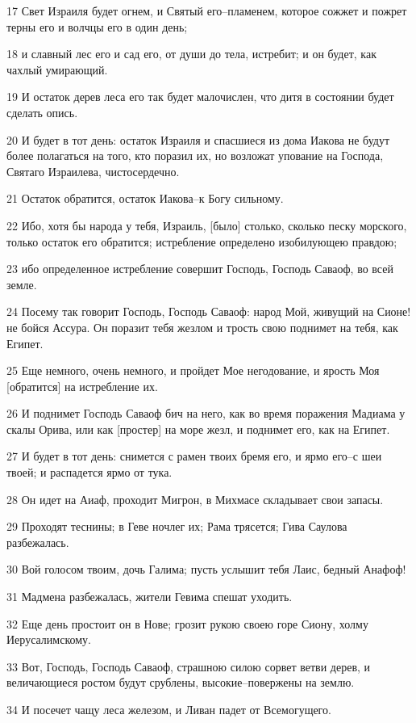 \par 17 Свет Израиля будет огнем, и Святый его--пламенем, которое сожжет и пожрет терны его и волчцы его в один день;
\par 18 и славный лес его и сад его, от души до тела, истребит; и он будет, как чахлый умирающий.
\par 19 И остаток дерев леса его так будет малочислен, что дитя в состоянии будет сделать опись.
\par 20 И будет в тот день: остаток Израиля и спасшиеся из дома Иакова не будут более полагаться на того, кто поразил их, но возложат упование на Господа, Святаго Израилева, чистосердечно.
\par 21 Остаток обратится, остаток Иакова--к Богу сильному.
\par 22 Ибо, хотя бы народа у тебя, Израиль, [было] столько, сколько песку морского, только остаток его обратится; истребление определено изобилующею правдою;
\par 23 ибо определенное истребление совершит Господь, Господь Саваоф, во всей земле.
\par 24 Посему так говорит Господь, Господь Саваоф: народ Мой, живущий на Сионе! не бойся Ассура. Он поразит тебя жезлом и трость свою поднимет на тебя, как Египет.
\par 25 Еще немного, очень немного, и пройдет Мое негодование, и ярость Моя [обратится] на истребление их.
\par 26 И поднимет Господь Саваоф бич на него, как во время поражения Мадиама у скалы Орива, или как [простер] на море жезл, и поднимет его, как на Египет.
\par 27 И будет в тот день: снимется с рамен твоих бремя его, и ярмо его--с шеи твоей; и распадется ярмо от тука.
\par 28 Он идет на Аиаф, проходит Мигрон, в Михмасе складывает свои запасы.
\par 29 Проходят теснины; в Геве ночлег их; Рама трясется; Гива Саулова разбежалась.
\par 30 Вой голосом твоим, дочь Галима; пусть услышит тебя Лаис, бедный Анафоф!
\par 31 Мадмена разбежалась, жители Гевима спешат уходить.
\par 32 Еще день простоит он в Нове; грозит рукою своею горе Сиону, холму Иерусалимскому.
\par 33 Вот, Господь, Господь Саваоф, страшною силою сорвет ветви дерев, и величающиеся ростом будут срублены, высокие--повержены на землю.
\par 34 И посечет чащу леса железом, и Ливан падет от Всемогущего.

